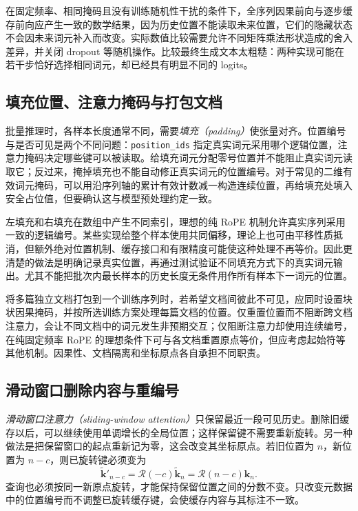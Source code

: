 \documentclass[UTF8,12pt,a4paper,fontset=fandol]{ctexart}
\begin{document}
在固定频率、相同掩码且没有训练随机性干扰的条件下，全序列因果前向与逐步缓存前向应产生一致的数学结果，因为历史位置不能读取未来位置，它们的隐藏状态不会因未来词元补入而改变。实际数值比较需要允许不同矩阵乘法形状造成的舍入差异，并关闭 dropout 等随机操作。比较最终生成文本太粗糙：两种实现可能在若干步恰好选择相同词元，却已经具有明显不同的 logits。

\subsection{填充位置、注意力掩码与打包文档}
批量推理时，各样本长度通常不同，需要\emph{填充（padding）}使张量对齐。位置编号与是否可见是两个不同问题：\texttt{position\_ids} 指定真实词元采用哪个逻辑位置，注意力掩码决定哪些键可以被读取。给填充词元分配零号位置并不能阻止真实词元读取它；反过来，掩掉填充也不能自动修正真实词元的位置编号。对于常见的二维有效词元掩码，可以用沿序列轴的累计有效计数减一构造连续位置，再给填充处填入安全占位值，但要确认这与模型预处理约定一致。

左填充和右填充在数组中产生不同索引，理想的纯 RoPE 机制允许真实序列采用一致的逻辑编号。某些实现给整个样本使用共同偏移，理论上也可由平移性质抵消，但额外绝对位置机制、缓存接口和有限精度可能使这种处理不再等价。因此更清楚的做法是明确记录真实位置，再通过测试验证不同填充方式下的真实词元输出。尤其不能把批次内最长样本的历史长度无条件用作所有样本下一词元的位置。

将多篇独立文档打包到一个训练序列时，若希望文档间彼此不可见，应同时设置块状因果掩码，并按所选训练方案处理每篇文档的位置。仅重置位置而不阻断跨文档注意力，会让不同文档中的词元发生非预期交互；仅阻断注意力却使用连续编号，在纯固定频率 RoPE 的理想条件下可与各文档重置原点等价，但应考虑起始符等其他机制。因果性、文档隔离和坐标原点各自承担不同职责。

\subsection{滑动窗口删除内容与重编号}
\emph{滑动窗口注意力（sliding-window attention）}只保留最近一段可见历史。删除旧缓存以后，可以继续使用单调增长的全局位置；这样保留键不需要重新旋转。另一种做法是把保留窗口的起点重新记为零，这会改变其坐标原点。若旧位置为 $n$，新位置为 $n-c$，则已旋转键必须变为
\begin{equation}
\widetilde{\mathbf k}'_{n-c}
=\mathcal R(-c)\widetilde{\mathbf k}_n
=\mathcal R(n-c)\mathbf k_n.
\label{eq:rope-rebase}
\end{equation}
查询也必须按同一新原点旋转，才能保持保留位置之间的分数不变。只改变元数据中的位置编号而不调整已旋转缓存键，会使缓存内容与其标注不一致。
\end{document}

